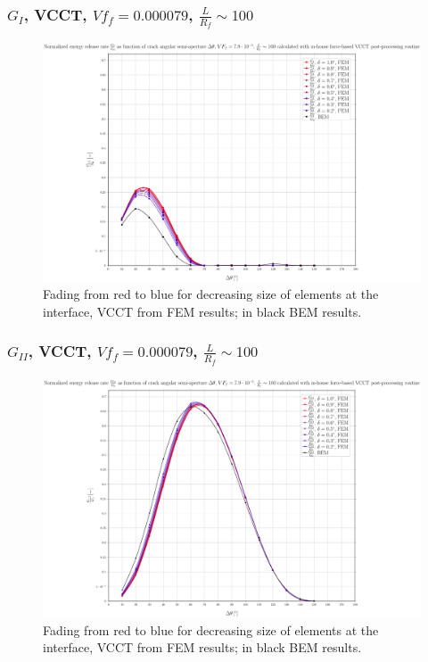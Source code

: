 \documentclass[first,firstsupp,lastsupp,last,hyperref,table]{ETHclass}
\begin{document}
\begin{frame}
\frametitle{\small $G_{I}$, VCCT, $Vf_{f}=0.000079$, $\frac{L}{R_{f}}\sim 100$}
\vspace{-0.5cm}
\centering
\captionsetup[figure]{font=scriptsize,labelfont=scriptsize}
\begin{figure}[!h]
\centering
\includegraphics[height=0.7\textheight]{2017-07-10_AbqRunSummary_SmallStrain_M-F-VCCT_GI.pdf}
  \caption{\scriptsize Fading from red to blue for decreasing size of elements at the interface, VCCT from FEM results; in black BEM results.}
  \label{fig:res1}
\end{figure}
\end{frame}

\begin{frame}
\frametitle{\small $G_{II}$, VCCT, $Vf_{f}=0.000079$, $\frac{L}{R_{f}}\sim 100$}
\vspace{-0.5cm}
\centering
\captionsetup[figure]{font=scriptsize,labelfont=scriptsize}
\begin{figure}[!h]
\centering
\includegraphics[height=0.7\textheight]{2017-07-10_AbqRunSummary_SmallStrain_M-F-VCCT_GII.pdf}
  \caption{\scriptsize Fading from red to blue for decreasing size of elements at the interface, VCCT from FEM results; in black BEM results.}
  \label{fig:res1}
\end{figure}
\end{frame}
\end{document}
